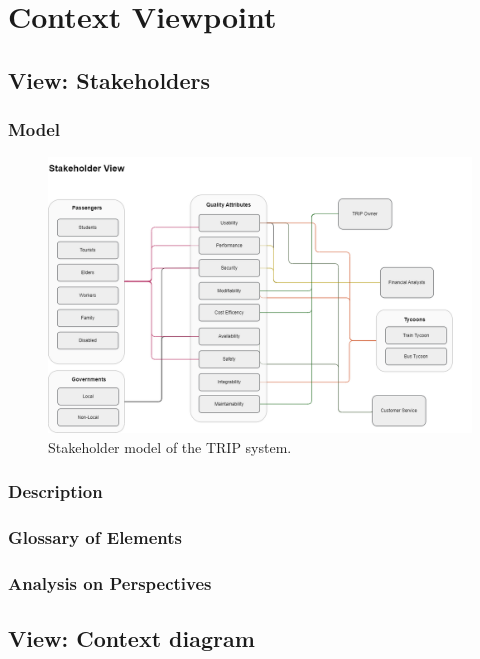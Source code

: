 \section{Context Viewpoint}

\subsection{View: Stakeholders}

\subsubsection{Model}
\begin{figure}[H]
    \centering
    \includegraphics[width=\textwidth]{drawings/views_final_version/stakeholder_view.png}
    \caption{Stakeholder model of the TRIP system.}
    \label{fig:stakeholder_view_model}
\end{figure}

\subsubsection{Description}
\subsubsection{Glossary of Elements}

\subsubsection{Analysis on Perspectives}

\subsection{View: Context diagram}
